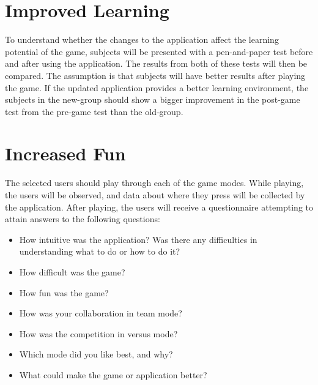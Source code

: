 
\section{Improved Learning}

To understand whether the changes to the application affect the learning potential of the game, subjects will be presented with a pen-and-paper test before and after using the application. The results from both of these tests will then be compared. The assumption is that subjects will have better results after playing the game. If the updated application provides a better learning environment, the subjects in the new-group should show a bigger improvement in the post-game test from the pre-game test than the old-group.


\section{Increased Fun}

The selected users should play through each of the game modes. While playing, the users will be observed, and data about where they press will be collected by the application. After playing, the users will receive a questionnaire attempting to attain answers to the following questions:

\begin{itemize}
	\item How intuitive was the application? Was there any difficulties in understanding what to do or how to do it?
	\item How difficult was the game?
	\item How fun was the game?
	\item How was your collaboration in team mode?
	\item How was the competition in versus mode?
	\item Which mode did you like best, and why?
	\item What could make the game or application better?
\end{itemize}

